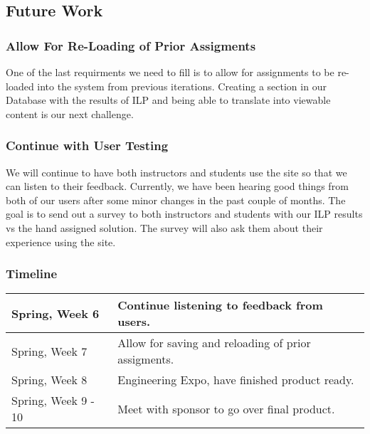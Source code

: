 \subsection{Future Work}

\subsubsection{Allow For Re-Loading of Prior Assigments}

One of the last requirments we need to fill is to allow for assignments to be re-loaded into the system from previous iterations.
Creating a section in our Database with the results of ILP and being able to translate into viewable content is our next challenge.

\subsubsection{Continue with User Testing}

We will continue to have both instructors and students use the site so that we can listen to their feedback.
Currently, we have been hearing good things from both of our users after some minor changes in the past couple of months.
The goal is to send out a survey to both instructors and students with our ILP results vs the hand assigned solution.
The survey will also ask them about their experience using the site.

\subsubsection{Timeline}

\begin{center}
  \begin{tabular}{| l | l |}
  \hline
  Spring, Week 6      & Continue listening to feedback from users. \\ \hline
  Spring, Week 7      & Allow for saving and reloading of prior assigments. \\ \hline
  Spring, Week 8      & Engineering Expo, have finished product ready. \\ \hline
  Spring, Week 9 - 10 & Meet with sponsor to go over final product. \\ \hline
  \end{tabular}
\end{center}
